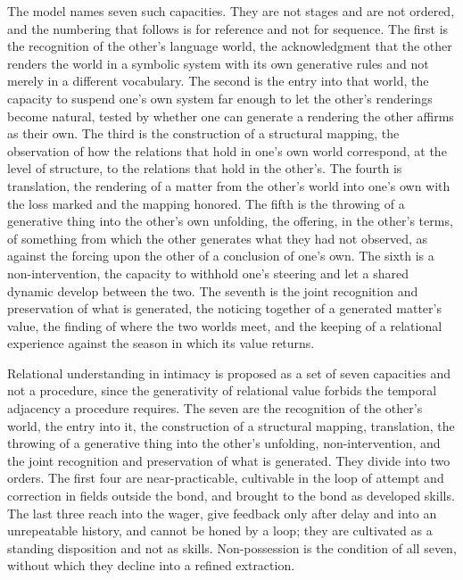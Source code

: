The model names seven such capacities. They are not stages and are not ordered, and the numbering that follows is for reference and not for sequence. The first is the recognition of the other's language world, the acknowledgment that the other renders the world in a symbolic system with its own generative rules and not merely in a different vocabulary. The second is the entry into that world, the capacity to suspend one's own system far enough to let the other's renderings become natural, tested by whether one can generate a rendering the other affirms as their own. The third is the construction of a structural mapping, the observation of how the relations that hold in one's own world correspond, at the level of structure, to the relations that hold in the other's. The fourth is translation, the rendering of a matter from the other's world into one's own with the loss marked and the mapping honored. The fifth is the throwing of a generative thing into the other's own unfolding, the offering, in the other's terms, of something from which the other generates what they had not observed, as against the forcing upon the other of a conclusion of one's own. The sixth is a non-intervention, the capacity to withhold one's steering and let a shared dynamic develop between the two. The seventh is the joint recognition and preservation of what is generated, the noticing together of a generated matter's value, the finding of where the two worlds meet, and the keeping of a relational experience against the season in which its value returns.

\begin{claim}
Relational understanding in intimacy is proposed as a set of seven capacities and not a procedure, since the generativity of relational value forbids the temporal adjacency a procedure requires. The seven are the recognition of the other's world, the entry into it, the construction of a structural mapping, translation, the throwing of a generative thing into the other's unfolding, non-intervention, and the joint recognition and preservation of what is generated. They divide into two orders. The first four are near-practicable, cultivable in the loop of attempt and correction in fields outside the bond, and brought to the bond as developed skills. The last three reach into the wager, give feedback only after delay and into an unrepeatable history, and cannot be honed by a loop; they are cultivated as a standing disposition and not as skills. Non-possession is the condition of all seven, without which they decline into a refined extraction.
\end{claim}

